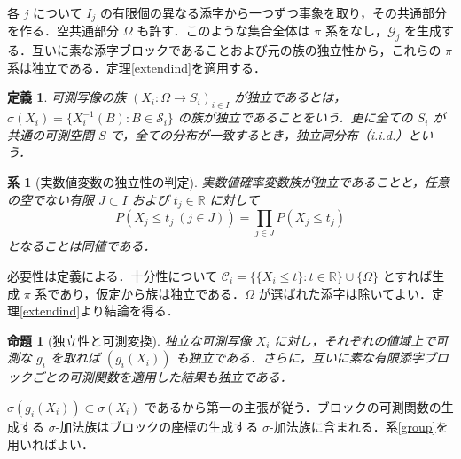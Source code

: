 \documentclass[a5paper,10pt,onecolumn]{jsarticle}
\makeatletter
\theoremstyle{mathnotetheorem}
\newtheorem{definition}[theorem]{定義}
\newtheorem{proposition}[theorem]{命題}
\newtheorem{corollary}[theorem]{系}
\renewcommand{\proofname}{証明}
\renewenvironment{proof}[1][\proofname]{%
  \par\pushQED{\qed}\normalfont\topsep4\p@\@plus2\p@\relax
  \trivlist\item[\hskip\labelsep\bfseries #1]\ignorespaces
}{\popQED\endtrivlist\@endpefalse}
\newcommand{\R}{\mathbb{R}}
\newcommand{\1}{\mathbf{1}}
\makeatother
\begin{document}
\begin{proof}
各 $j$ について $I_j$ の有限個の異なる添字から一つずつ事象を取り，その共通部分を作る．空共通部分 $\Omega$ も許す．このような集合全体は $\pi$ 系をなし，$\mathcal G_j$ を生成する．互いに素な添字ブロックであることおよび元の族の独立性から，これらの $\pi$ 系は独立である．定理\ref{extendind}を適用する．
\end{proof}
\begin{definition}
可測写像の族 $(X_i:\Omega\to S_i)_{i\in I}$ が独立であるとは，$\sigma(X_i)=\{X_i^{-1}(B):B\in\mathcal S_i\}$ の族が独立であることをいう．更に全ての $S_i$ が共通の可測空間 $S$ で，全ての分布が一致するとき，独立同分布（i.i.d.）という．
\end{definition}
\begin{corollary}[実数値変数の独立性の判定]
実数値確率変数族が独立であることと，任意の空でない有限 $J\subset I$ および $t_j\in\R$ に対して
\[
 P(X_j\le t_j\ (j\in J))=\prod_{j\in J}P(X_j\le t_j)
\]
となることは同値である．
\end{corollary}
\begin{proof}
必要性は定義による．十分性について $\mathcal C_i=\{\{X_i\le t\}:t\in\R\}\cup\{\Omega\}$ とすれば生成 $\pi$ 系であり，仮定から族は独立である．$\Omega$ が選ばれた添字は除いてよい．定理\ref{extendind}より結論を得る．
\end{proof}
\begin{proposition}[独立性と可測変換]
独立な可測写像 $X_i$ に対し，それぞれの値域上で可測な $g_i$ を取れば $(g_i(X_i))$ も独立である．さらに，互いに素な有限添字ブロックごとの可測関数を適用した結果も独立である．
\end{proposition}
\begin{proof}
$\sigma(g_i(X_i))\subset\sigma(X_i)$ であるから第一の主張が従う．ブロックの可測関数の生成する $\sigma$-加法族はブロックの座標の生成する $\sigma$-加法族に含まれる．系\ref{group}を用いればよい．
\end{proof}
\end{document}

